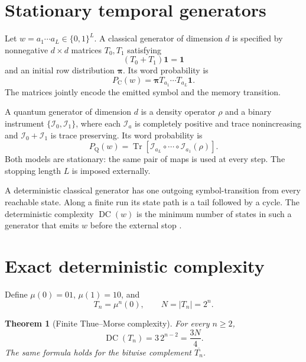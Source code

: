 \documentclass[a4paper,twocolumn,11pt,unpublished]{quantumarticle}
\newtheorem{theorem}{Theorem}
\newcommand{\DC}{\operatorname{DC}}
\newcommand{\Tr}{\operatorname{Tr}}
\begin{document}
\section{Stationary temporal generators}
\label{sec:model}

Let $w=a_1\cdots a_L\in\{0,1\}^L$.  A classical generator of dimension $d$
is specified by nonnegative $d\times d$ matrices $T_0,T_1$ satisfying
\begin{equation}
  (T_0+T_1)\boldsymbol{1}=\boldsymbol{1}
  \label{eq:classicalnormalization}
\end{equation}
and an initial row distribution $\boldsymbol{\pi}$.  Its word probability is
\begin{equation}
  P_{\mathrm C}(w)=
  \boldsymbol{\pi}T_{a_1}\cdots T_{a_L}\boldsymbol{1}.
  \label{eq:classicalprob}
\end{equation}
The matrices jointly encode the emitted symbol and the memory transition.

A quantum generator of dimension $d$ is a density operator $\rho$ and a
binary instrument $\{\mathcal I_0,\mathcal I_1\}$, where each
$\mathcal I_a$ is completely positive and trace nonincreasing and
$\mathcal I_0+\mathcal I_1$ is trace preserving.  Its word probability is
\begin{equation}
  P_{\mathrm Q}(w)=
  \Tr\!\left[
  \mathcal I_{a_L}\circ\cdots\circ\mathcal I_{a_1}(\rho)
  \right].
  \label{eq:quantumprob}
\end{equation}
Both models are stationary: the same pair of maps is used at every step.
The stopping length $L$ is imposed externally.

A deterministic classical generator has one outgoing symbol-transition
from every reachable state.  Along a finite run its state path is a tail
followed by a cycle.  The deterministic complexity $\DC(w)$ is the minimum
number of states in such a generator that emits $w$ before the external stop
\cite{VieiraBudroni2022}.

\section{Exact deterministic complexity}
\label{sec:deterministic}

Define $\mu(0)=01$, $\mu(1)=10$, and
\begin{equation}
  T_n=\mu^n(0),\qquad N=|T_n|=2^n.
\end{equation}

\begin{theorem}[Finite Thue--Morse complexity]
\label{thm:dc}
For every $n\geq2$,
\begin{equation}
  \boxed{\DC(T_n)=3\,2^{n-2}=\frac{3N}{4}.}
  \label{eq:dc}
\end{equation}
The same formula holds for the bitwise complement $\overline{T_n}$.
\end{theorem}
\end{document}
